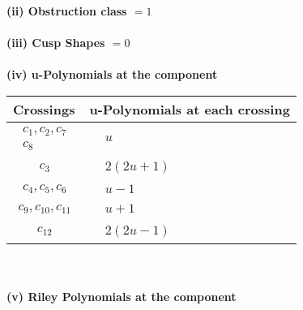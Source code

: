 \documentclass[1p]{elsarticle_modified}
\theoremstyle{definition}
\begin{document}
\flushleft \textbf{(ii) Obstruction class $= 1$}\\~\\
\flushleft \textbf{(iii) Cusp Shapes $= 0$}\\~\\
\newpage\renewcommand{\arraystretch}{1}
\flushleft \textbf{(iv) u-Polynomials at the component}\newline \\
\begin{tabular}{m{50pt}|m{274pt}}
Crossings & \hspace{64pt}u-Polynomials at each crossing \\
\hline $$\begin{aligned}c_{1},c_{2},c_{7}\\c_{8}\end{aligned}$$&$\begin{aligned}
&u
\end{aligned}$\\
\hline $$\begin{aligned}c_{3}\end{aligned}$$&$\begin{aligned}
&2(2 u+1)
\end{aligned}$\\
\hline $$\begin{aligned}c_{4},c_{5},c_{6}\end{aligned}$$&$\begin{aligned}
&u-1
\end{aligned}$\\
\hline $$\begin{aligned}c_{9},c_{10},c_{11}\end{aligned}$$&$\begin{aligned}
&u+1
\end{aligned}$\\
\hline $$\begin{aligned}c_{12}\end{aligned}$$&$\begin{aligned}
&2(2 u-1)
\end{aligned}$\\
\hline
\end{tabular}\\~\\
\newpage\renewcommand{\arraystretch}{1}
\flushleft \textbf{(v) Riley Polynomials at the component}\newline \\
\end{document}
